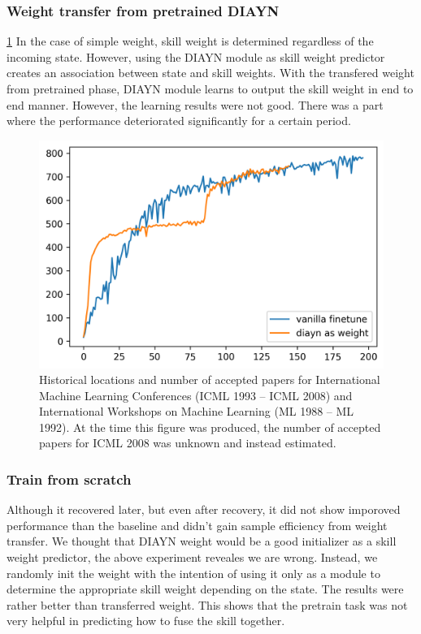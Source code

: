 \subsubsection{Weight transfer from pretrained DIAYN}

\cref*{diayn-as-skill-weight}
In the case of simple weight, skill weight is determined regardless of the incoming state.
However, using the DIAYN module as skill weight predictor creates an association between state and skill weights.
With the transfered weight from pretrained phase, DIAYN module learns to output the skill weight in end to end manner.
However, the learning results were not good.
There was a part where the performance deteriorated significantly for a certain period.

\begin{figure}[ht]
  \vskip 0.2in
  \begin{center}
  \centerline{\includegraphics[width=\columnwidth]{Figures/diayn_as_skill_on_walker_run.png}}
  \caption{Historical locations and number of accepted papers for International
  Machine Learning Conferences (ICML 1993 -- ICML 2008) and International
  Workshops on Machine Learning (ML 1988 -- ML 1992). At the time this figure was
  produced, the number of accepted papers for ICML 2008 was unknown and instead
  estimated.}
  \label{diayn-as-skill-weight}
  \end{center}
  \vskip -0.2in
  \end{figure}

\subsubsection{Train from scratch}
Although it recovered later, but even after recovery, it did not show imporoved performance than the baseline and didn't gain sample efficiency from weight transfer.
We thought that DIAYN weight would be a good initializer as a skill weight predictor, the above experiment reveales we are wrong.
Instead, we randomly init the weight with the intention of using it only as a module to determine the appropriate skill weight depending on the state.
The results were rather better than transferred weight.
This shows that the pretrain task was not very helpful in predicting how to fuse the skill together.





